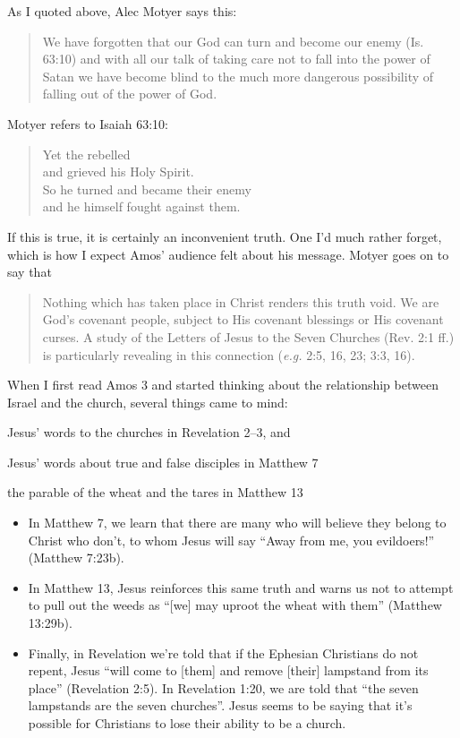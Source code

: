 As I quoted above, Alec Motyer says this:

\begin{quote}
    We have forgotten that our God can turn and become our enemy (Is. 63:10) and
    with all our talk of taking care not to fall into the power of Satan we have
    become blind to the much more dangerous possibility of falling out of the
    power of God.
    \autocite[79]{motyer:1974}
\end{quote}

Motyer refers to Isaiah 63:10:

\begin{quote}
    Yet the rebelled\\
    \VerseIndent and grieved his Holy Spirit.\\
    So he turned and became their enemy\\
    \VerseIndent and he himself fought against them.
\end{quote}

If this is true, it is certainly an inconvenient truth. One I'd much rather
forget, which is how I expect Amos' audience felt about his message. Motyer goes
on to say that

\begin{quote}
    Nothing which has taken place in Christ renders this truth void. We are
    God's covenant people, subject to His covenant blessings or His covenant
    curses. A study of the Letters of Jesus to the Seven Churches (Rev. 2:1 ff.)
    is particularly revealing in this connection (\textit{e.g.} 2:5, 16, 23;
    3:3, 16).
\end{quote}

When I first read Amos 3 and started thinking about the relationship between
Israel and the church, several things came to mind:
\begin{inparaenum}[(1)]
\item Jesus' words to the churches in Revelation 2--3, and
\item Jesus' words about true and false disciples in Matthew 7
\item the parable of the wheat and the tares in Matthew 13
\end{inparaenum}

\begin{itemize}
    \item In Matthew 7, we learn that there are many who will believe they
        belong to Christ who don't, to whom Jesus will say \enquote{Away from
        me, you evildoers!} (Matthew 7:23b).
    \item In Matthew 13, Jesus reinforces this same truth and warns us not to
        attempt to pull out the weeds as \enquote{[we] may uproot the wheat with
        them} (Matthew 13:29b).
    \item Finally, in Revelation we're told that if the Ephesian Christians do
        not repent, Jesus \enquote{will come to [them] and remove [their]
        lampstand from its place} (Revelation 2:5). In Revelation 1:20, we are
        told that \enquote{the seven lampstands are the seven churches}. Jesus
        seems to be saying that it's possible for Christians to lose their
        ability to be a church.
\end{itemize}

